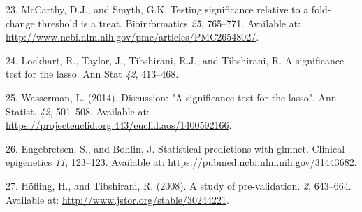 \documentclass[
]{book}
\newenvironment{cslreferences}%
  {}%
  {\par}
\begin{document}
\begin{cslreferences}
\leavevmode\hypertarget{ref-McCarthy:2009aa}{}%
23. McCarthy, D.J., and Smyth, G.K. Testing significance relative to a fold-change threshold is a treat. Bioinformatics \emph{25}, 765--771. Available at: \url{http://www.ncbi.nlm.nih.gov/pmc/articles/PMC2654802/}.

\leavevmode\hypertarget{ref-Lockhart:2014aa}{}%
24. Lockhart, R., Taylor, J., Tibshirani, R.J., and Tibshirani, R. A significance test for the lasso. Ann Stat \emph{42}, 413--468.

\leavevmode\hypertarget{ref-Wasserman:2014aa}{}%
25. Wasserman, L. (2014). Discussion: "A significance test for the lasso". Ann. Statist. \emph{42}, 501--508. Available at: \url{https://projecteuclid.org:443/euclid.aos/1400592166}.

\leavevmode\hypertarget{ref-Engebretsen:2019aa}{}%
26. Engebretsen, S., and Bohlin, J. Statistical predictions with glmnet. Clinical epigenetics \emph{11}, 123--123. Available at: \url{https://pubmed.ncbi.nlm.nih.gov/31443682}.

\leavevmode\hypertarget{ref-Hofling:2008aa}{}%
27. Höfling, H., and Tibshirani, R. (2008). A study of pre-validation. \emph{2}, 643--664. Available at: \url{http://www.jstor.org/stable/30244221}.
\end{cslreferences}
\end{document}
